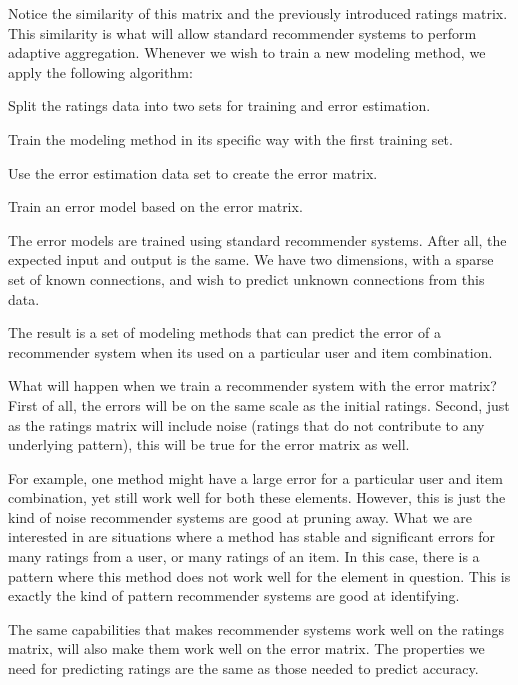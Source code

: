 Notice the similarity of this matrix and the previously introduced ratings matrix.
This similarity is what will allow standard recommender systems
to perform adaptive aggregation.
Whenever we wish to train a new modeling method,
we apply the following algorithm:

\begin{enumerate*}
  \item Split the ratings data into two sets for training and error estimation.
  \item Train the modeling method in its specific way with the first training set.
  \item Use the error estimation data set to create the error matrix.
  \item Train an error model based on the error matrix.
\end{enumerate*}

The error models are trained using standard recommender systems.
After all, the expected input and output is the same.
We have two dimensions, with a sparse set of known connections,
and wish to predict unknown connections from this data.

The result is a set of modeling methods
that can predict the error of a recommender system
when its used on a particular user and item combination.

What will happen when we train a recommender system with the error matrix?
First of all, the errors will be on the same scale as the initial ratings.
Second, just as the ratings matrix will include noise (ratings that
do not contribute to any underlying pattern), this will be 
true for the error matrix as well.

For example, one method might have a large error for a particular user and item combination,
yet still work well for both these elements. 
However, this is just the kind of noise recommender systems are good at pruning away.
What we are interested in are situations where a method
has stable and significant errors for many ratings from a user,
or many ratings of an item.
In this case, there is a pattern where this method does not 
work well for the element in question.
This is exactly the kind of pattern recommender systems are good at identifying.

The same capabilities that makes recommender systems work well
on the ratings matrix, will also make them work well on the error matrix.
The properties we need for predicting ratings
are the same as those needed to predict accuracy.

